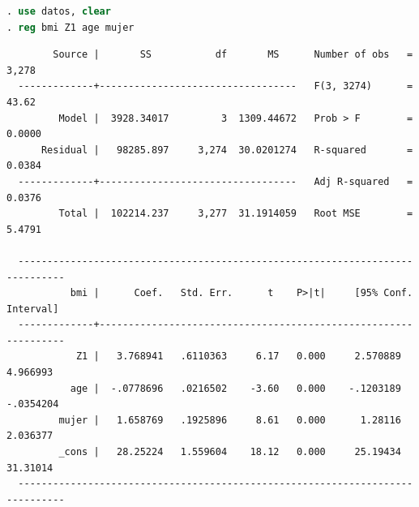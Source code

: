 \begin{frame}[fragile]
	\begin{lstlisting}[language=Stata, numbers=none]
. use datos, clear
. reg bmi Z1 age mujer
	\end{lstlisting}
	\scriptsize{
		\begin{verbatim}
        Source |       SS           df       MS      Number of obs   =     3,278
  -------------+----------------------------------   F(3, 3274)      =     43.62
         Model |  3928.34017         3  1309.44672   Prob > F        =    0.0000
      Residual |   98285.897     3,274  30.0201274   R-squared       =    0.0384
  -------------+----------------------------------   Adj R-squared   =    0.0376
         Total |  102214.237     3,277  31.1914059   Root MSE        =    5.4791
  
  ------------------------------------------------------------------------------
           bmi |      Coef.   Std. Err.      t    P>|t|     [95% Conf. Interval]
  -------------+----------------------------------------------------------------
            Z1 |   3.768941   .6110363     6.17   0.000     2.570889    4.966993
           age |  -.0778696   .0216502    -3.60   0.000    -.1203189   -.0354204
         mujer |   1.658769   .1925896     8.61   0.000      1.28116    2.036377
         _cons |   28.25224   1.559604    18.12   0.000     25.19434    31.31014
  ------------------------------------------------------------------------------
		\end{verbatim}
	}
\end{frame}
